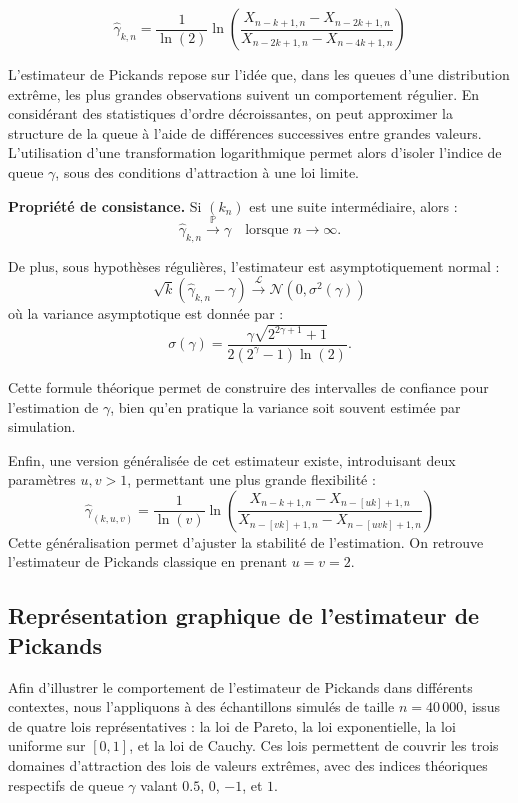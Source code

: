 \documentclass{article}
\begin{document}
\[
\hat{\gamma}_{k,n} = \frac{1}{\ln(2)} \ln\left( \frac{X_{n-k+1,n} - X_{n-2k+1,n}}{X_{n-2k+1,n} - X_{n-4k+1,n}} \right)
\]

\medskip
L’estimateur de Pickands repose sur l’idée que, dans les queues d’une distribution extrême, les plus grandes observations suivent un comportement régulier. En considérant des statistiques d’ordre décroissantes, on peut approximer la structure de la queue à l’aide de différences successives entre grandes valeurs. L’utilisation d’une transformation logarithmique permet alors d’isoler l’indice de queue \(\gamma\), sous des conditions d’attraction à une loi limite.

\medskip
\textbf{Propriété de consistance.} Si \((k_n)\) est une suite intermédiaire, alors :
\[
\hat{\gamma}_{k,n} \xrightarrow{\mathbb{P}} \gamma
\quad \text{lorsque } n \to \infty.
\]

De plus, sous hypothèses régulières, l’estimateur est asymptotiquement normal :
\[
\sqrt{k} \left( \hat{\gamma}_{k,n} - \gamma \right) \xrightarrow{\mathcal{L}} \mathcal{N}(0, \sigma^2(\gamma))
\]
où la variance asymptotique est donnée par :
\[
\sigma(\gamma) = \frac{\gamma \sqrt{2^{2\gamma + 1} + 1}}{2(2^{\gamma} - 1)\ln(2)}.
\]

\medskip
Cette formule théorique permet de construire des intervalles de confiance pour l’estimation de \(\gamma\), bien qu’en pratique la variance soit souvent estimée par simulation.

\medskip
Enfin, une version généralisée de cet estimateur existe, introduisant deux paramètres \(u, v > 1\), permettant une plus grande flexibilité :
\[
\hat{\gamma}_{(k,u,v)} = \frac{1}{\ln(v)} \ln\left( \frac{X_{n-k+1,n} - X_{n-[uk]+1,n}}{X_{n-[vk]+1,n} - X_{n-[uvk]+1,n}} \right)
\]
Cette généralisation permet d'ajuster la stabilité de l'estimation. On retrouve l'estimateur de Pickands classique en prenant \(u = v = 2\).

\subsection{Représentation graphique de l’estimateur de Pickands}

Afin d'illustrer le comportement de l’estimateur de Pickands dans différents contextes, nous l'appliquons à des échantillons simulés de taille \(n = 40\,000\), issus de quatre lois représentatives : la loi de Pareto, la loi exponentielle, la loi uniforme sur \([0,1]\), et la loi de Cauchy. Ces lois permettent de couvrir les trois domaines d’attraction des lois de valeurs extrêmes, avec des indices théoriques respectifs de queue \(\gamma\) valant \(0.5\), \(0\), \(-1\), et \(1\).
\end{document}
